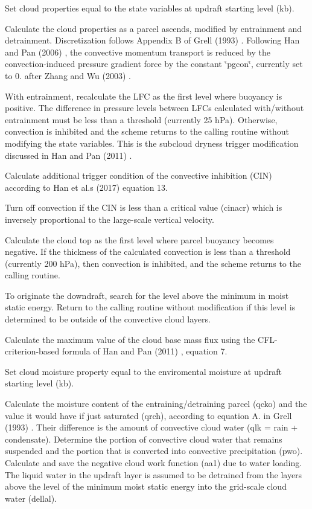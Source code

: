 \begin{DoxyItemize}
\item Set cloud properties equal to the state variables at updraft starting level (kb).
\item Calculate the cloud properties as a parcel ascends, modified by entrainment and detrainment. Discretization follows Appendix B of Grell (1993) \cite{grell_1993} . Following Han and Pan (2006) \cite{han_and_pan_2006}, the convective momentum transport is reduced by the convection-\/induced pressure gradient force by the constant \char`\"{}pgcon\char`\"{}, currently set to 0. after Zhang and Wu (2003) \cite{zhang_and_wu_2003} .
\item With entrainment, recalculate the L\+FC as the first level where buoyancy is positive. The difference in pressure levels between L\+F\+Cs calculated with/without entrainment must be less than a threshold (currently 25 h\+Pa). Otherwise, convection is inhibited and the scheme returns to the calling routine without modifying the state variables. This is the subcloud dryness trigger modification discussed in Han and Pan (2011) \cite{han_and_pan_2011}.
\item Calculate additional trigger condition of the convective inhibition (C\+IN) according to Han et al.\textquotesingle{}s (2017) \cite{han_et_al_2017} equation 13.
\item Turn off convection if the C\+IN is less than a critical value (cinacr) which is inversely proportional to the large-\/scale vertical velocity.
\item Calculate the cloud top as the first level where parcel buoyancy becomes negative. If the thickness of the calculated convection is less than a threshold (currently 200 h\+Pa), then convection is inhibited, and the scheme returns to the calling routine.
\item To originate the downdraft, search for the level above the minimum in moist static energy. Return to the calling routine without modification if this level is determined to be outside of the convective cloud layers.
\item Calculate the maximum value of the cloud base mass flux using the C\+F\+L-\/criterion-\/based formula of Han and Pan (2011) \cite{han_and_pan_2011}, equation 7.
\item Set cloud moisture property equal to the enviromental moisture at updraft starting level (kb).
\item Calculate the moisture content of the entraining/detraining parcel (qcko) and the value it would have if just saturated (qrch), according to equation A. in Grell (1993) \cite{grell_1993} . Their difference is the amount of convective cloud water (qlk = rain + condensate). Determine the portion of convective cloud water that remains suspended and the portion that is converted into convective precipitation (pwo). Calculate and save the negative cloud work function (aa1) due to water loading. The liquid water in the updraft layer is assumed to be detrained from the layers above the level of the minimum moist static energy into the grid-\/scale cloud water (dellal).

\end{DoxyItemize}
